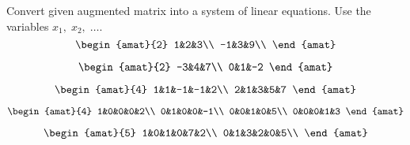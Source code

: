 

\begin{Exercise}[
name={},
title={}, 
difficulty=0,
origin={\cite{GH}}]
Convert given augmented matrix into a system of linear equations. Use the variables $x_1,\;x_2,\;\ldots$.
\Question
\[
\begin{amat}{2}
1&2&3\\
-1&3&9\\
\end{amat}
\]

\Question
\[
\begin{amat}{2}
-3&4&7\\
0&1&-2
\end{amat}
\]

\Question
\[
\begin{amat}{4}
1&1&-1&-1&2\\
2&1&3&5&7
\end{amat}
\]

\Question
\[
\begin{amat}{4}
1&0&0&0&2\\
0&1&0&0&-1\\
0&0&1&0&5\\
0&0&0&1&3
\end{amat}
\]

\Question
\[
\begin{amat}{5}
1&0&1&0&7&2\\
0&1&3&2&0&5\\
\end{amat}
\]

\end{Exercise}

